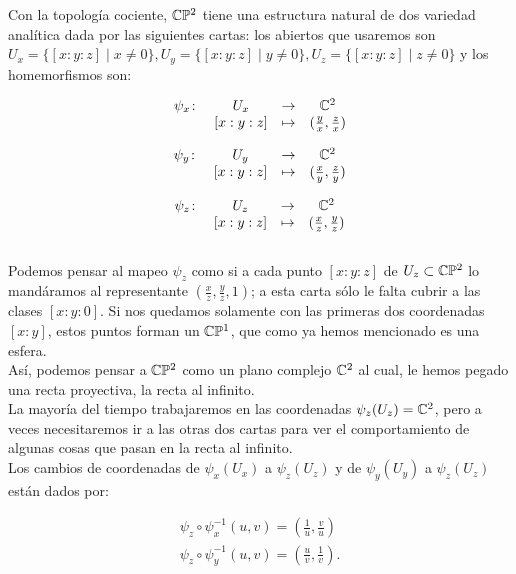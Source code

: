 Con la topología cociente, $\mathbb{C}\mathbb{P}^2$ tiene una estructura natural de  dos variedad analítica dada por las siguientes cartas: los abiertos que usaremos son $U_{x}=\{[x:y:z] \mid x\neq 0\},U_{y}=\{[x:y:z] \mid y\neq 0\},U_{z}=\{[x:y:z] \mid z\neq 0\}$ y los homemorfismos son:

$$
\begin{matrix}
\psi_{x} \colon & U_{x} &  \rightarrow & \mathbb{C}^{2}\\
& [x:y:z] &  \mapsto &  (\frac{y}{x},\frac{z}{x})
\end{matrix}
$$

$$
\begin{matrix}
\psi_{y} \colon & U_{y} &  \rightarrow & \mathbb{C}^{2}\\
& [x:y:z] &  \mapsto &  (\frac{x}{y},\frac{z}{y})
\end{matrix}
$$

$$
\begin{matrix}
\psi_{z} \colon & U_{z} &  \rightarrow & \mathbb{C}^{2}\\
& [x:y:z] &  \mapsto &  (\frac{x}{z},\frac{y}{z})
\end{matrix}
$$\\

Podemos pensar al mapeo $\psi_{z}$ como si a cada punto $[x:y:z]$ de $U_{z}\subset\mathbb{C}\mathbb{P}^2$ lo mandáramos al representante $(\tfrac{x}{z},\tfrac{y}{z},1)$; a esta carta sólo le falta cubrir a las clases $[x:y:0]$. Si nos quedamos solamente con las primeras dos coordenadas $[x:y]$, estos puntos forman un $\mathbb{C}\mathbb{P}^{1}$, que como ya hemos mencionado es una esfera.\\

Así, podemos pensar a $\mathbb{C}\mathbb{P}^2$ como un plano complejo $\mathbb{C}^{2}$ al cual, le hemos pegado una recta proyectiva, la recta al infinito.\\ 
 
La mayoría del tiempo trabajaremos en las coordenadas $\psi_{z}(U_{z})=\mathbb{C}^{2}$, pero a veces necesitaremos ir a las otras dos cartas para ver el comportamiento de algunas cosas que pasan en la recta al infinito.\\

Los cambios de coordenadas de $\psi_{x}(U_{x})$ a $\psi_{z}(U_{z})$ y de $\psi_{y}(U_{y})$ a $\psi_{z}(U_{z})$ están dados por:

\begin{equation} 
\label{CambiosDeCoordenadas}
\begin{aligned}
\psi_{z} \circ \psi^{-1}_{x}(u,v) = (\frac{1}{u},\frac{v}{u})\\
\psi_{z} \circ \psi^{-1}_{y}(u,v) = (\frac{u}{v},\frac{1}{v}).
\end{aligned}
\end{equation}


